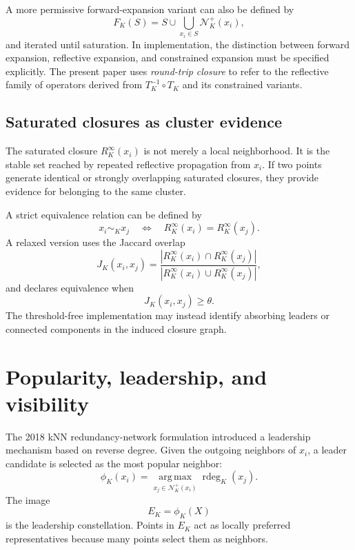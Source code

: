 \documentclass[11pt,a4paper]{article}
\newcommand{\calN}{\mathcal{N}}
\newcommand{\rdeg}{\operatorname{rdeg}}
\newcommand{\argmax}{\operatorname*{arg\,max}}
\begin{document}
A more permissive forward-expansion variant can also be defined by
\begin{equation}
F_K(S)=S\cup\bigcup_{x_i\in S}\calN_K^+(x_i),
\end{equation}
and iterated until saturation. In implementation, the distinction between forward expansion, reflective expansion, and constrained expansion must be specified explicitly. The present paper uses \emph{round-trip closure} to refer to the reflective family of operators derived from $T_K^{-1}\circ T_K$ and its constrained variants.

\subsection{Saturated closures as cluster evidence}

The saturated closure $R_K^\infty(x_i)$ is not merely a local neighborhood. It is the stable set reached by repeated reflective propagation from $x_i$. If two points generate identical or strongly overlapping saturated closures, they provide evidence for belonging to the same cluster.

A strict equivalence relation can be defined by
\begin{equation}
x_i\sim_K x_j
\quad\Longleftrightarrow\quad
R_K^\infty(x_i)=R_K^\infty(x_j).
\end{equation}
A relaxed version uses the Jaccard overlap
\begin{equation}
J_K(x_i,x_j)=
\frac{|R_K^\infty(x_i)\cap R_K^\infty(x_j)|}
{|R_K^\infty(x_i)\cup R_K^\infty(x_j)|},
\end{equation}
and declares equivalence when
\begin{equation}
J_K(x_i,x_j)\geq \theta.
\end{equation}
The threshold-free implementation may instead identify absorbing leaders or connected components in the induced closure graph.

\section{Popularity, leadership, and visibility}
\label{sec:leadership}

The 2018 kNN redundancy-network formulation introduced a leadership mechanism based on reverse degree. Given the outgoing neighbors of $x_i$, a leader candidate is selected as the most popular neighbor:
\begin{equation}
\phi_K(x_i)=\argmax_{x_j\in\calN_K^+(x_i)}\rdeg_K(x_j).
\label{eq:leader_function}
\end{equation}
The image
\begin{equation}
E_K=\phi_K(X)
\end{equation}
is the leadership constellation. Points in $E_K$ act as locally preferred representatives because many points select them as neighbors.
\end{document}
